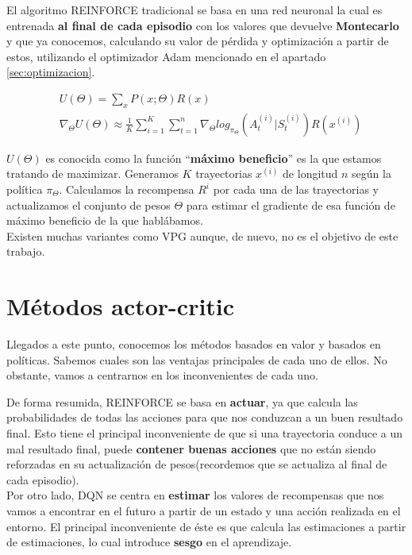 \documentclass[11pt,fleqn]{book} %
\begin{document}
El algoritmo REINFORCE tradicional se basa en una red neuronal la cual es entrenada \textbf{al final de cada episodio} con los valores que devuelve \textbf{Montecarlo} y que ya conocemos, calculando su valor de pérdida y optimización a partir de estos, utilizando el optimizador Adam mencionado en el apartado \ref{sec:optimizacion}.

\begin{align*}
&U(\Theta)=\sum_xP(x;\Theta)R(x)\\
&\nabla_\Theta U(\Theta) \approx \frac{1}{K}\sum^K_{i=1}\sum^n_{t=1}\nabla_\Theta log_{\pi_\Theta}(A^{(i)}_t|S^{(i)}_t)R(x^{(i)})
\end{align*}

$U(\Theta)$ es conocida como la función ``\textbf{máximo beneficio}'' es la que estamos tratando de maximizar. Generamos $K$ trayectorias $x^{(i)}$ de longitud $n$ según la política $\pi_ \Theta$. Calculamos la recompensa $R^i$ por cada una de las trayectorias y actualizamos el conjunto de pesos $\Theta$ para estimar el gradiente de esa función de máximo beneficio de la que hablábamos. \\

Existen muchas variantes como VPG aunque, de nuevo, no es el objetivo de este trabajo.

\section{Métodos actor-critic}

Llegados a este punto, conocemos los métodos basados en valor y basados en políticas. Sabemos cuales son las ventajas principales de cada uno de ellos. No obstante, vamos a centrarnos en los inconvenientes de cada uno.

De forma resumida, REINFORCE se basa en \textbf{actuar}, ya que calcula las probabilidades de todas las acciones para que nos conduzcan a un buen resultado final. Esto tiene el principal inconveniente de que si una trayectoria conduce a un mal resultado final, puede \textbf{contener buenas acciones} que no están siendo reforzadas en su actualización de pesos(recordemos que se actualiza al final de cada episodio). \\

Por otro lado, DQN se centra en \textbf{estimar} los valores de recompensas que nos vamos a encontrar en el futuro a partir de un estado y una acción realizada en el entorno. El principal inconveniente de éste es que calcula las estimaciones a partir de estimaciones, lo cual introduce \textbf{sesgo} en el aprendizaje. \\
\end{document}
